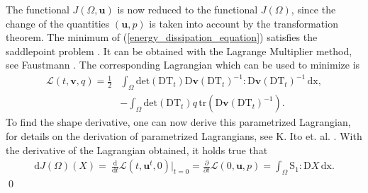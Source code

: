 \begin{proof*}
    The functional $J(\Omega,\mathbf{u})$ is now reduced to the functional $J(\Omega)$, since the change of the quantities $(\mathbf{u},p)$
    is taken into account by the transformation theorem. The minimum of (\ref{energy_dissipation_equation})
    satisfies the saddlepoint problem . It can be obtained with the Lagrange Multiplier method, 
    see Faustmann . The corresponding Lagrangian which can be used to minimize is
    \begin{equation}\label{parametrized_lagrangian}
     \begin{aligned}
        \mathcal{L}(t,\mathbf{v}, q) = \frac{1}{2}& \int_{\Omega} \mathrm{det}(\mathrm{DT}_t) \mathrm{D} \mathbf{v}(\mathrm{DT}_t)^{-1} :
        \mathrm{D} \mathbf{v}(\mathrm{DT}_t)^{-1} \, \mathrm{dx}, \\
        &- \int_{\Omega}\mathrm{det}(\mathrm{DT}_t)q \, \mathrm{tr} \left( \mathrm{D}\mathbf{v}(\mathrm{DT}_t)^{-1} \right).
    \end{aligned}
    \end{equation}
    To find the shape derivative, one can now derive this parametrized Lagrangian, for details on the derivation of parametrized Lagrangians, 
    see K. Ito et. al. . With the derivative of the Lagrangian obtained, it holds true that
    \begin{align}
        \mathrm{d}J(\Omega)(X) =\ \frac{\mathrm{d}}{\mathrm{d}t} \mathcal{L}(t, \mathbf{u}^t, 0)\big\rvert_{t=0}  =
        \frac{\partial}{\partial t}\mathcal{L}(0,\mathbf{u},p) = \int_{\Omega} \mathrm{S}_1 : \mathrm{D}X \, \mathrm{dx}.
    \end{align}
    \qed
    \end{proof*}